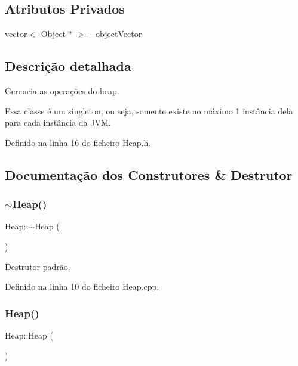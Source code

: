 \subsection*{Atributos Privados}
\begin{DoxyCompactItemize}
\item 
vector$<$ \hyperlink{classObject}{Object} $\ast$ $>$ \hyperlink{classHeap_a55b6cf9504fbe890a49e667c80dae717}{\+\_\+object\+Vector}
\end{DoxyCompactItemize}


\subsection{Descrição detalhada}
Gerencia as operações do heap. 

Essa classe é um singleton, ou seja, somente existe no máximo 1 instância dela para cada instância da J\+VM. 

Definido na linha 16 do ficheiro Heap.\+h.



\subsection{Documentação dos Construtores \& Destrutor}
\mbox{\label{classHeap_a734051272cbd0945d3916a1a89707ba2}} 
\subsubsection{\texorpdfstring{$\sim$\+Heap()}{~Heap()}}
{\footnotesize\ttfamily Heap\+::$\sim$\+Heap (\begin{DoxyParamCaption}{ }\end{DoxyParamCaption})}



Destrutor padrão. 



Definido na linha 10 do ficheiro Heap.\+cpp.

\mbox{\label{classHeap_a6595efd3562a6334d2f5471c2b3b7cb4}} 
\subsubsection{\texorpdfstring{Heap()}{Heap()}\hspace{0.1cm}{\footnotesize\ttfamily [1/2]}}
{\footnotesize\ttfamily Heap\+::\+Heap (\begin{DoxyParamCaption}{ }\end{DoxyParamCaption})\hspace{0.3cm}{\ttfamily [private]}}

